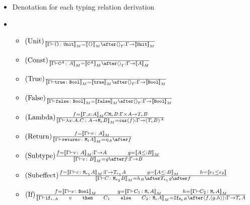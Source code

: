 \documentclass{report}
\begin{document}
\begin{itemize}
    \item Denotation for each typing relation derivation
    \item \begin{itemize}
        \item $\treerule{Unit}{}{\deno{\typerelation{\G}{\u}{\U}} = \deno{\u} \after \term{\G} : \G \rightarrow \deno{\U}}$
        
        \item $\treerule{Const}{}{\deno{\typerelation{\G}{\const{A}}{A}} = \deno{\const{A}} \after \term{\G} : \G \rightarrow \deno{A}}$
         
        \item $\treerule{True}{}{\deno{\typerelation{\G}{\t}{\B}} = \deno{\t} \after \term{\G} : \G \rightarrow \deno{\B}}$
        
        \item $\treerule{False}{}{\deno{\typerelation{\G}{\f}{\B}} = \deno{\f} \after \term{\G} : \G \rightarrow \deno{\B}}$
        
        \item $(\text{Lambda}) \frac{f = {\bf [\![}\Gamma, x: A{\bf ]\!]}_M{C}{\texttt{M}_{\epsilon}{B}} : \Gamma \times A \rightarrow T_{\epsilon}{B}}{{\bf [\![}\Gamma \vdash \lambda x : A. C \colon A \rightarrow \texttt{M}_{\epsilon}{B}{\bf ]\!]}_M = \texttt{cur}(f) : \Gamma \rightarrow (T_{\epsilon}{B})^A}$
        
        \item $\treerule{Return}{f = \deno{\typerelation{\G}{v}{A}}}{\deno{\typerelation{\G}{\return{v}}{\M{\1}{A}}} = \point{A} \after f}$
        
        \item $\treerule{Subtype}{f = \deno{\typerelation{\G}{v}{A}} : \G \rightarrow A\s\s g = \deno{A \subtype B}}{\deno{\typerelation{\G}{v}{B}} = g \after f : \G \rightarrow B}$
        \item $\treerule{Subeffect}{f = \deno{\typerelation{\G}{c}{\M{\e_1}{A}}}: \G \rightarrow \T{\e_1}{A} \s\s g = \deno{A \subtype B}\s\s h = \dse{\e_1}{\e_2}}{\deno{\typerelation{\G}{C}{\M{\e_2}{B}}} = h_B \after \T{\e_1}{g} \after f}$
        
        \item $\treerule{If}{f = \deno{\typerelation{\G}{v}{\B}}\s\s g = \deno{\typerelation{\G}{C_1}{\mea}}\s\s h = \deno{\typerelation{\G}{C_2}{\mea}}}{\deno{{\typerelation{\G}{\ifthenelse{\e}{A}{v}{C_1}{C_2}}{\mea}}} = \ifnt{\meb} \after \pr{f}{\pr{g}{h}} : \G \rightarrow \T{\e}{A}}$
        

\end{itemize}
\end{itemize}
\end{document}
